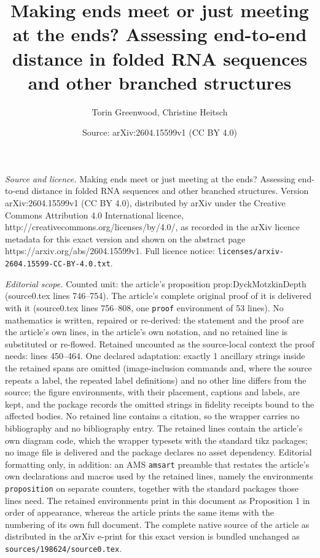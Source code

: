 \documentclass[10pt,a4paper]{amsart}
\title{Making ends meet or just meeting at the ends? Assessing end-to-end distance in folded RNA sequences and other branched structures}
\author{Torin Greenwood, Christine Heitsch}
\date{Source: arXiv:2604.15599v1 (CC BY 4.0)}
\begin{document}
\maketitle

\noindent\emph{Source and licence.} Making ends meet or just meeting at the ends? Assessing end-to-end distance in folded RNA sequences and other branched structures. Version arXiv:2604.15599v1 (CC BY 4.0), distributed by arXiv under the Creative Commons Attribution 4.0 International licence, http://creativecommons.org/licenses/by/4.0/, as recorded in the arXiv licence metadata for this exact version and shown on the abstract page https://arxiv.org/abs/2604.15599v1. Full licence notice: \texttt{licenses/arxiv-2604.15599-CC-BY-4.0.txt}.\par\smallskip

\noindent\textit{Editorial scope.} Counted unit: the article's proposition prop:DyckMotzkinDepth (source0.tex lines 746--754). The article's complete original proof of it is delivered with it (source0.tex lines 756--808, one \texttt{proof} environment of 53 lines). No mathematics is written, repaired or re-derived: the statement and the proof are the article's own lines, in the article's own notation, and no retained line is substituted or re-flowed.  Retained uncounted as the source-local context the proof needs: lines 450--464.  One declared adaptation: exactly 1 ancillary strings inside the retained spans are omitted (image-inclusion commands and, where the source repeats a label, the repeated label definitions) and no other line differs from the source; the figure environments, with their placement, captions and labels, are kept, and the package records the omitted strings in fidelity receipts bound to the affected bodies.  No retained line contains a citation, so the wrapper carries no bibliography and no bibliography entry.  The retained lines contain the article's own diagram code, which the wrapper typesets with the standard tikz packages; no image file is delivered and the package declares no asset dependency.  Editorial formatting only, in addition: an AMS \texttt{amsart} preamble that restates the article's own declarations and macros used by the retained lines, namely the environments \texttt{proposition} on separate counters, together with the standard packages those lines need.  The retained environments print in this document as Proposition 1 in order of appearance, whereas the article prints the same items with the numbering of its own full document.  The complete native source of the article as distributed in the arXiv e-print for this exact version is bundled unchanged as \texttt{sources/198624/source0.tex}.
\end{document}
